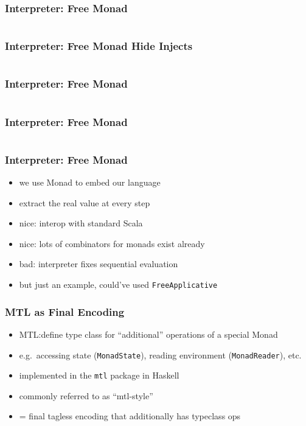 \documentclass[aspectratio=169, hyperref={colorlinks, linkcolor=beamer@centricgreen}, urlcolor=links]{beamer}
\begin{document}
\begin{frame}
  \frametitle{Interpreter: Free Monad}
  \inputminted[fontsize=\footnotesize]{scala}{snippets/initial-free-expr.scala}
\end{frame}

\begin{frame}
  \frametitle{Interpreter: Free Monad \textemdash{} Hide Injects}
  \inputminted[fontsize=\footnotesize]{scala}{snippets/initial-free-ctors.scala}
\end{frame}

\begin{frame}
  \frametitle{Interpreter: Free Monad}
  \inputminted[fontsize=\footnotesize]{scala}{snippets/initial-free-sample.scala}
\end{frame}

\begin{frame}
  \frametitle{Interpreter: Free Monad}
  \inputminted[fontsize=\footnotesize]{scala}{snippets/initial-free-interp.scala}
\end{frame}

\begin{frame}
  \frametitle{Interpreter: Free Monad}
  \begin{itemize}
  \item we use Monad to embed our language
  \item extract the real value at every step
  \item nice: interop with standard Scala
  \item nice: lots of combinators for monads exist already
  \item bad: interpreter fixes sequential evaluation
  \item but just an example, could've used \texttt{FreeApplicative}
  \end{itemize}
\end{frame}

\begin{frame}
  \frametitle{MTL as Final Encoding}
  \begin{itemize}
  \item MTL:\@ define type class for ``additional'' operations of a special Monad
  \item e.g.\ accessing state (\texttt{MonadState}), reading environment (\texttt{MonadReader}), etc.
  \item implemented in the \texttt{mtl} package in Haskell
  \item commonly referred to as ``mtl-style''
  \item = final tagless encoding that additionally has typeclass ops
  \end{itemize}
\end{frame}
\end{document}
